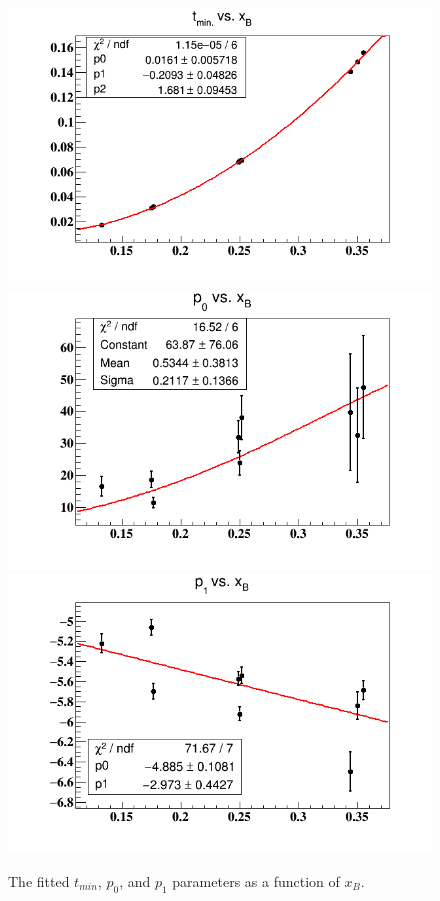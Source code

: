 \begin{figure}[tpb]
   \centering
\includegraphics[scale=0.37]{fig_updated/tmin-xB-fit.png}\\
\includegraphics[scale=0.37]{fig_updated/p0-xB-fit.png}\\
\includegraphics[scale=0.37]{fig_updated/p1-xB-fit.png}
\caption{The fitted $t_{min}$, $p_0$, and $p_1$ parameters as a function of 
$x_B$.}
\label{fig:free-proton-alu}
\end{figure}

